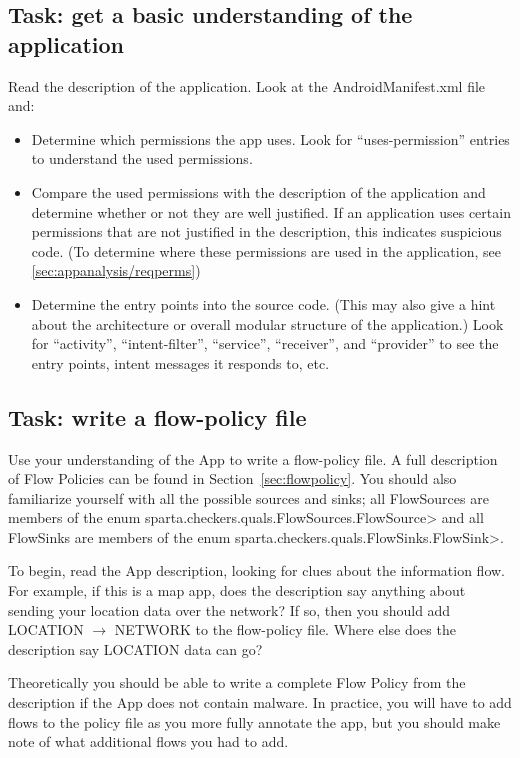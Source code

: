 \subsection{Task: get a basic understanding of the application}
Read the description of the application.  
Look at the AndroidManifest.xml file and:
\begin{itemize}
\item Determine which permissions the app uses.
  Look for ``uses-permission'' entries to understand the used
  permissions.
\item Compare the used permissions with the description of the
  application and determine whether or not they are well justified.
  If an application uses certain permissions that are not justified
  in the description, this indicates suspicious code. 
  (To determine where these permissions are used in the application,
   see \ref{sec:appanalysis/reqperms})
\item Determine the entry points into the source code. (This may also give
  a hint about the architecture or overall modular structure of the
  application.)
  Look for ``activity'', ``intent-filter'', ``service'', ``receiver'', and
  ``provider'' to see the entry points, intent messages it responds to,
  etc.
\end{itemize}

\subsection{Task: write a flow-policy file}

Use your understanding of the App to write a flow-policy file.  A full description of Flow Policies can be 
found in Section~\ref{sec:flowpolicy}.   You should also familiarize yourself with all the possible sources and sinks; 
 all FlowSources  are
members of the enum \<sparta.checkers.quals.FlowSources.FlowSource> and all FlowSinks are
members of the enum \<sparta.checkers.quals.FlowSinks.FlowSink>.

To begin, read the App description, looking for clues about the information flow.  For example,
if this is a map app, does the description say anything about sending your location data over the
 network?  If so, then you should add LOCATION $\rightarrow$ NETWORK to the flow-policy file.  Where
else does the description say LOCATION data can go?   

Theoretically you should be able to write a complete Flow Policy from the description 
if the App does not contain malware.  In practice, you will have to add flows to the policy file as you
 more fully annotate the app, but you should make note of what additional flows you had to add.
 
